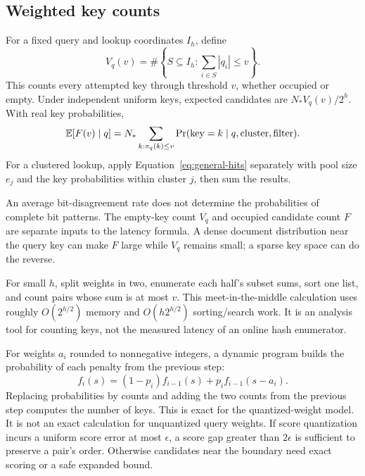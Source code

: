 \subsection{Weighted key counts}
For a fixed query and lookup coordinates $I_h$, define
\begin{equation}
V_q(v)=\#\left\{S\subseteq I_h:\sum_{i\in S}|q_i|\leq v\right\}.
\label{eq:weighted-volume}
\end{equation}
This counts every attempted key through threshold $v$, whether occupied or empty. Under
independent uniform keys, expected candidates are $N_*V_q(v)/2^h$. With real key probabilities,
\begin{equation}
\mathbb E[F(v)\mid q]=N_*\sum_{k:\pi_q(k)\leq v}\Pr(\text{key}=k\mid q,\text{cluster},\text{filter}).
\label{eq:general-hits}
\end{equation}
For a clustered lookup, apply Equation~\eqref{eq:general-hits} separately with pool size $e_j$ and the key probabilities within cluster $j$, then sum the results.

An average bit-disagreement rate does not determine the probabilities of complete bit patterns.
The empty-key count $V_q$ and occupied candidate count $F$ are separate inputs to the latency
formula. A dense document distribution near the query key can make $F$ large while $V_q$
remains small; a sparse key space can do the reverse.

For small $h$, split weights in two, enumerate each half's subset sums, sort one list, and
count pairs whose sum is at most $v$. This meet-in-the-middle calculation uses roughly
$O(2^{h/2})$ memory and $O(h2^{h/2})$ sorting/search work. It is an analysis tool for counting
keys, not the measured latency of an online hash enumerator.

For weights $a_i$ rounded to nonnegative integers, a dynamic program builds the probability of each penalty from the previous step:
\begin{equation}
f_{i}(s)=(1-p_i)f_{i-1}(s)+p_i f_{i-1}(s-a_i).
\label{eq:dp}
\end{equation}
Replacing probabilities by counts and adding the two counts from the previous step computes the number of keys.
This is exact for the quantized-weight model. It is not an exact calculation
for unquantized query weights. If score quantization incurs a uniform score error at most
$\epsilon$, a score gap greater than $2\epsilon$ is sufficient to preserve a pair's order.
Otherwise candidates near the boundary need exact scoring or a safe expanded bound.

